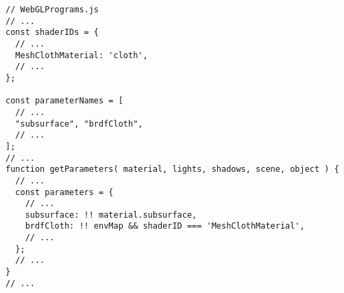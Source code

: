 \singlespacing
\begin{lstlisting}[caption=Cambios sobre la clase WebGLPrograms de ThreeJs]
// WebGLPrograms.js
// ...
const shaderIDs = {
  // ...
  MeshClothMaterial: 'cloth',
  // ...
};

const parameterNames = [
  // ...
  "subsurface", "brdfCloth",
  // ...
];
// ...
function getParameters( material, lights, shadows, scene, object ) {
  // ...
  const parameters = {
    // ...
    subsurface: !! material.subsurface,
    brdfCloth: !! envMap && shaderID === 'MeshClothMaterial',
    // ...
  };
  // ...
}
// ...
\end{lstlisting}








